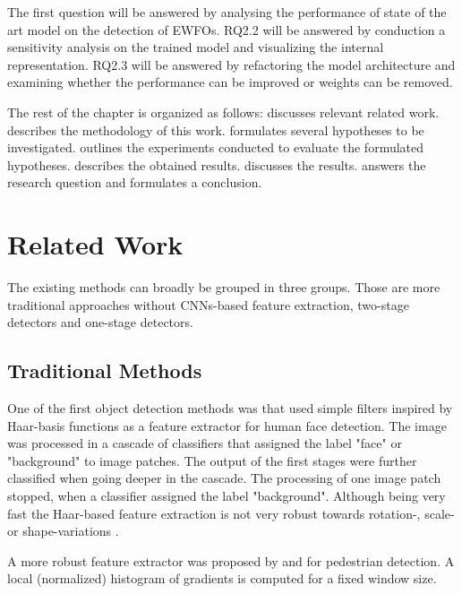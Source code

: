 	The first question will be answered by analysing the performance of state of the art model on the detection of \acp{EWFO}. RQ2.2 will be answered by conduction a sensitivity analysis on the trained model and visualizing the internal representation. RQ2.3 will be answered by refactoring the model architecture and examining whether the performance can be improved or weights can be removed.

	The rest of the chapter is organized as follows:  discusses relevant related work.  describes the methodology of this work.  formulates several hypotheses to be investigated.  outlines the experiments conducted to evaluate the formulated hypotheses.  describes the obtained results.  discusses the results.  answers the research question and formulates a conclusion.


	\section{Related Work}
	\label{sec:object_detection:related}
	The existing methods can broadly be grouped in three groups. Those are more traditional approaches without \acp{CNN}-based feature extraction, two-stage detectors and one-stage detectors.
	
	\subsection{Traditional Methods}
	
	One of the first object detection methods was \cite{Viola2004} that used simple filters inspired by Haar-basis functions as a feature extractor for human face detection. The image was processed in a cascade of classifiers that assigned the label "face" or "background" to image patches. The output of the first stages were further classified when going deeper in the cascade. The processing of one image patch stopped, when a classifier assigned the label "background". Although being very fast the Haar-based feature extraction is not very robust towards rotation-, scale- or shape-variations . 
	
	A more robust feature extractor was proposed by \cite{Dalal} and \cite{Lowe2004} for pedestrian detection. A local (normalized) histogram of gradients is computed for a fixed window size. 

